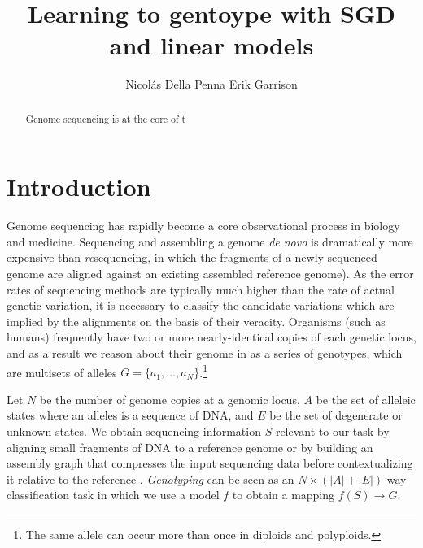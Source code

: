 \documentclass{article}
\title{Learning to gentoype with SGD and linear models}
\author{
Nicol\'as Della Penna
\And
Erik Garrison \\
} %
\begin{document}

\maketitle

\begin{abstract}
Genome sequencing is at the core of t

\end{abstract}

\section{Introduction}



Genome sequencing has rapidly become a core observational process in biology and medicine.
Sequencing and assembling a genome \emph{de novo} is dramatically more expensive than \emph{re}sequencing, in which the fragments of a newly-sequenced genome are aligned against an existing assembled reference genome).
As the error rates of sequencing methods are typically much higher than the rate of actual genetic variation, it is necessary to classify the candidate variations which are implied by the alignments on the basis of their veracity.
Organisms (such as humans) frequently have two or more nearly-identical copies of each genetic locus, and as a result we reason about their genome in as a series of genotypes, which are multisets of alleles $G = \{ a_1, \ldots, a_N \}$.\footnote{The same allele can occur more than once in diploids and polyploids.} 

Let $N$ be the number of genome copies at a genomic locus, $A$ be the set of alleleic states where an alleles is a sequence of DNA, and $E$ be the set of degenerate or unknown states.
We obtain sequencing information $S$ relevant to our task by aligning small fragments of DNA to a reference genome \cite{li2013bwamem} or by building an assembly graph that compresses the input sequencing data before contextualizing it relative to the reference \cite{myers2005, simpson2010, li2015fermikit, iqbal2012}.
\emph{Genotyping} can be seen as an $N \times ( |A| + |E| )$-way classification task in which we use a model $f$ to obtain a mapping $f(S) \to G$.

\end{document}
